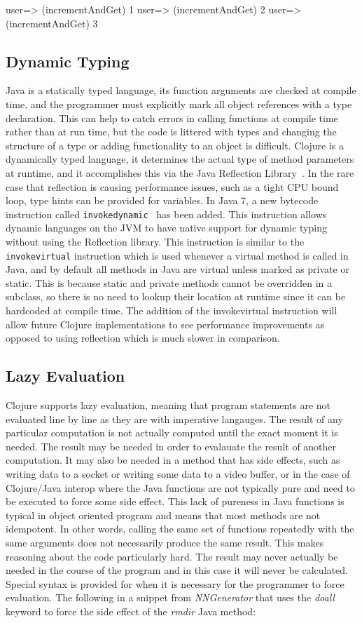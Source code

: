 user=> (incrementAndGet)
1
user=> (incrementAndGet)
2
user=> (incrementAndGet)
3
 
\subsection{Dynamic Typing}
Java is a statically typed language, its function arguments are
checked at compile time, and the programmer must explicitly mark all
object references with a
type declaration. 
This can help to catch errors in calling functions at compile time
rather than at run time, but the code is littered with types and
changing the structure of a type or adding functionality to an object
is difficult.     
Clojure is a dynamically typed language, it determines the actual type
of method parameters at runtime, and it accomplishes this via the Java
Reflection Library~\cite{reflection}. 
In the rare case that reflection is causing performance issues, such
as a tight CPU bound loop, type hints can be provided for variables. 
In Java 7, a new bytecode instruction called
{\tt invokedynamic}~\cite{invokedynamic} has been added.
This instruction allows dynamic
languages on the JVM to have native support for dynamic typing without
using the Reflection library. 
This instruction is similar to the {\tt invokevirtual} instruction which is
used whenever a virtual method is called in Java, and by default all
methods in Java are virtual unless marked as private or static. 
This is because static and private methods cannot be overridden in a
subclass, so there is no need to lookup their location at runtime
since it can be hardcoded at compile time. 
The addition of the invokevirtual instruction will allow future Clojure implementations to see performance improvements as opposed to using reflection which is much slower in comparison.  

\subsection{Lazy Evaluation}
Clojure supports lazy evaluation, meaning that program statements are not
evaluated line by line as they are with imperative langauges. 
The result of any particular computation is not actually computed until the
exact moment it is needed.
The result may be needed in order to evalauate the result of another
computation. 
It may also be needed in a method that has side effects, such as
writing data to a socket or writing some data to a video buffer, or in
the case of Clojure/Java interop where the Java functions are not
typically pure and need to be executed to force some side effect.
This lack of pureness in Java functions is typical in object oriented
program and means that most methods are not idempotent.
In other words, calling the same set of functions repeatedly with the
same arguments does not necessarily produce the same result.
This makes reasoning about the code particularly hard.
The result may never actually be needed in the course of the program
and in this case it will never be calculated.
Special syntax is provided for when it is necessary for the programmer
to force
evaluation. The following in a snippet from {\em NNGenerator} that
uses the {\it doall} keyword to force the side effect of the {\it rmdir} Java method: 

